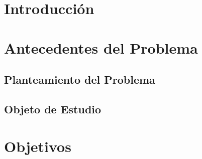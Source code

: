 \documentclass{univalle-perfil}
\begin{document}
\makecaratula

\tableofcontents
\listoffigures


\section{Introducción}


\section{Antecedentes del Problema}


\subsection{Planteamiento del Problema}


\subsection{Objeto de Estudio}


\section{Objetivos}
\end{document}
